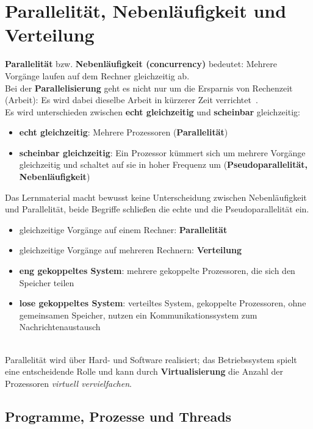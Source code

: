 \section{Parallelität, Nebenläufigkeit und Verteilung}


\textbf{Parallelität} bzw. \textbf{Nebenläufigkeit (concurrency)} bedeutet: Mehrere Vorgänge laufen auf dem Rechner gleichzeitig ab.\\

Bei der \textbf{Parallelisierung} geht es nicht nur um die Ersparnis von Rechenzeit (Arbeit): Es wird dabei dieselbe Arbeit in kürzerer Zeit verrichtet~\cite[40]{Oec22}.\\

Es wird unterschieden zwischen \textbf{echt gleichzeitig} und \textbf{scheinbar} gleichzeitig:
\begin{itemize}
    \item \textbf{echt gleichzeitig}: Mehrere Prozessoren (\textbf{Parallelität})
    \item \textbf{scheinbar gleichzeitig}: Ein Prozessor kümmert sich um mehrere Vorgänge gleichzeitig und schaltet auf sie in hoher Frequenz um (\textbf{Pseudoparallelität, Nebenläufigkeit})
\end{itemize}

Das Lernmaterial macht bewusst keine Unterscheidung zwischen Nebenläufigkeit und Parallelität, beide Begriffe schließen die echte und die Pseudoparallelität ein.

\begin{itemize}[label=$\rightarrow$]
    \item gleichzeitige Vorgänge auf einem Rechner: \textbf{Parallelität}
    \item gleichzeitige Vorgänge auf mehreren Rechnern: \textbf{Verteilung}
    \item \textbf{eng gekoppeltes System}: mehrere gekoppelte Prozessoren, die sich den Speicher teilen
    \item \textbf{lose gekoppeltes System}: verteiltes System, gekoppelte Prozessoren, ohne gemeinsamen Speicher, nutzen ein Kommunikationssystem zum Nachrichtenaustausch
\end{itemize}\\

Parallelität wird über Hard- und Software realisiert; das Betriebssystem spielt eine entscheidende Rolle und kann durch \textbf{Virtualisierung} die Anzahl der Prozessoren \textit{virtuell vervielfachen}.

\subsection{Programme, Prozesse und Threads}

